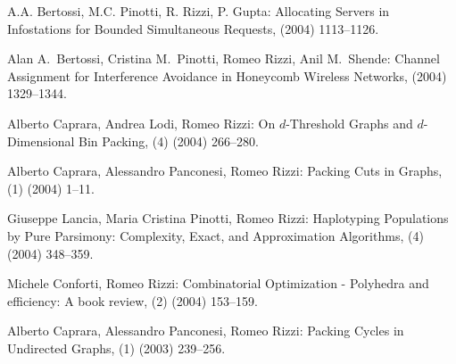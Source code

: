 \begin{etaremune}
  \item {\sc A.A. Bertossi, M.C. Pinotti, R. Rizzi, P. Gupta:} %
   \newblock  Allocating Servers in Infostations for Bounded Simultaneous Requests,
    (2004) 1113--1126.

  \item {\sc Alan A.~Bertossi, Cristina M.~Pinotti, Romeo Rizzi, Anil M.~Shende:}
   \newblock  Channel Assignment for Interference Avoidance in Honeycomb Wireless Networks,
    (2004) 1329--1344.

  \item {\sc Alberto Caprara, Andrea Lodi, Romeo Rizzi:}
   \newblock  On $d$-Threshold Graphs and $d$-Dimensional Bin Packing,
   (4) (2004) 266--280.

  \item {\sc Alberto Caprara, Alessandro Panconesi, Romeo Rizzi:}
   \newblock  Packing Cuts in Graphs,
   (1) (2004) 1--11.

  \item {\sc Giuseppe Lancia, Maria Cristina Pinotti, Romeo Rizzi:}
   \newblock  Haplotyping Populations by Pure Parsimony: Complexity, 
              Exact, and Approximation Algorithms,
   (4) (2004) 348--359.

  \item {\sc Michele Conforti, Romeo Rizzi:}  
   \newblock  Combinatorial Optimization
              - Polyhedra and efficiency: A book review,
   (2) (2004) 153--159.

  \item {\sc Alberto Caprara, Alessandro Panconesi, Romeo Rizzi:}
   \newblock  Packing Cycles in Undirected Graphs,
   (1) (2003) 239--256.


\end{etaremune}
